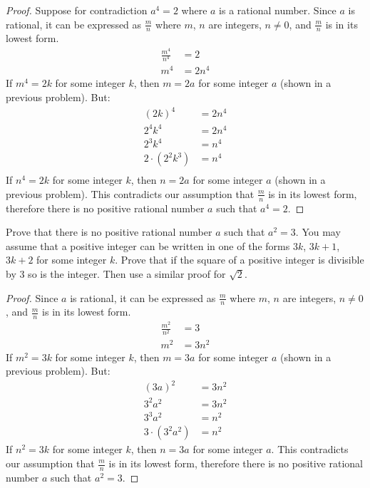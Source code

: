 \documentclass[6pt]{article}
\begin{document}
\begin{proof} Suppose for contradiction $a^4 = 2$ where $a$ is a rational number.
Since $a$ is rational, it can be expressed as $\frac{m}{n}$ where $m$, $n$ are integers, 
$n \not = 0$, and $\frac{m}{n}$
is in its lowest form.
\begin{align*}
\frac{m^4}{n^4} &= 2 \\
m^4 &= 2n^4
\end{align*}
If $m^4 = 2k$ for some integer $k$, then $m = 2a$ for some integer $a$ (shown in a previous problem). 
But:
\begin{align*}
{(2k)}^4 &= 2n^4 \\
2^4k^4 &= 2n^4 \\
2^3k^4 &= n^4 \\
2 \cdot (2^2k^3) &= n^4 \\
\end{align*}
If $n^4 = 2k$ for some integer $k$, then $n = 2a$ for some integer $a$ (shown in a previous problem). 
This contradicts our assumption that $\frac{m}{n}$ is in its lowest form, therefore
there is no positive rational number $a$ such that $a^4 = 2$.
\end{proof}


\begin{tcolorbox}[title=Problem 10, breakable]
Prove that there is no positive rational number $a$ such that $a^2 = 3$. You 
may assume that a positive integer can be written in one of the forms
$3k$, $3k + 1$, $3k + 2$ for some integer $k$. Prove that if the square of a
positive integer is divisible by $3$ so is the integer. Then use a similar proof
for $\sqrt{2}$.
\end{tcolorbox}

\begin{proof}
Since $a$ is rational, it can be expressed as $\frac{m}{n}$ where $m$, $n$ are integers, 
$n \not = 0$, and $\frac{m}{n}$
is in its lowest form.
\begin{align*}
\frac{m^2}{n^2} &= 3 \\
m^2 &= 3n^2
\end{align*}
If $m^2 = 3k$ for some integer $k$, then $m = 3a$ for some integer $a$ (shown in a previous problem). 
But:
\begin{align*}
{(3a)}^2 &= 3n^2 \\
3^2a^2 &= 3n^2 \\
3^3a^2 &= n^2 \\
3 \cdot (3^2a^2) &= n^2
\end{align*}
If $n^2 = 3k$ for some integer $k$, then $n = 3a$ for some integer $a$. 
This contradicts our assumption that $\frac{m}{n}$ is in its lowest form, therefore
there is no positive rational number $a$ such that $a^2 = 3$.
\end{proof}
\end{document}
